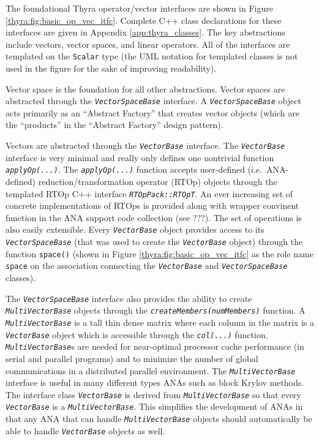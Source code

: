 \documentclass[pdf,ps2pdf,11pt]{SANDreport}
\begin{document}
The foundational Thyra operator/vector interfaces are shown in Figure
{}\ref{thyra:fig:basic_op_vec_itfc}.  Complete C++ class declarations for
these interfaces are given in Appendix {}\ref{app:thyra_classes}.  The key
abstractions include vectors, vector spaces, and linear operators.  All of the
interfaces are templated on the {}\texttt{Scalar} type (the UML notation for
templated classes is not used in the figure for the sake of improving
readability).

Vector space is the foundation for all other abstractions.  Vector spaces are
abstracted through the {}\texttt{\textit{Vector\-Space\-Base}} interface.  A
{}\texttt{\textit{Vector\-Space\-Base}} object acts primarily as an ``Abstract
Factory'' {}\cite{ref:gama_et_al_1995} that creates vector objects (which are
the ``products'' in the ``Abstract Factory'' design pattern).

Vectors are abstracted through the {}\texttt{\textit{Vector\-Base}} interface.
The {}\texttt{\textit{Vector\-Base}} interface is very minimal and really only
defines one nontrivial function {}\texttt{\textit{applyOp(\-...)}}.  The
{}\texttt{\textit{applyOp(\-...)}} function accepts user-defined
(i.e.~ANA-defined) reduction/transformation operator (RTOp) objects through
the templated RTOp C++ interface {}\texttt{\textit{RTOpPack::RTOpT}}.  An ever
increasing set of concrete implementations of RTOps is provided along with
wrapper convinent function in the ANA support code collection (see ???).  The
set of operations is also easily extensible.  Every
{}\texttt{\textit{Vector\-Base}} object provides access to its
{}\texttt{\textit{Vector\-Space\-Base}} (that was used to create the
{}\texttt{\textit{Vector\-Base}} object) through the function
{}\texttt{space()} (shown in Figure {}\ref{thyra:fig:basic_op_vec_itfc} as the
role name {}\texttt{space} on the association connecting the
{}\texttt{\textit{Vector\-Base}} and {}\texttt{\textit{Vector\-Space\-Base}}
classes).

The {}\texttt{\textit{Vector\-Space\-Base}} interface also provides the
ability to create {}\texttt{\textit{Multi\-Vector\-Base}} objects through the
{}\texttt{\textit{createMembers(numMembers)}} function.  A
{}\texttt{\textit{Multi\-Vector\-Base}} is a tall thin dense matrix where each
column in the matrix is a {}\texttt{\textit{Vector\-Base}} object which is
accessible through the {}\texttt{\textit{col(...)}} function.
{}\texttt{\textit{Multi\-Vector\-Base}}s are needed for near-optimal processor
cache performance (in serial and parallel programs) and to minimize the number
of global communications in a distributed parallel environment.  The
{}\texttt{\textit{Multi\-Vector\-Base}} interface is useful in many different
types ANAs such as block Krylov methods.  The interface class
{}\texttt{\textit{Vector\-Base}} is derived from
{}\texttt{\textit{Multi\-Vector\-Base}} so that every
{}\texttt{\textit{Vector\-Base}} is a {}\texttt{\textit{Multi\-Vector\-Base}}.
This simplifies the development of ANAs in that any ANA that can handle
{}\texttt{\textit{Multi\-Vector\-Base}} objects should automatically be able
to handle {}\texttt{\textit{Vector\-Base}} objects as well.
\end{document}
